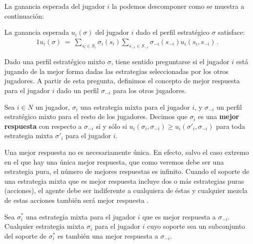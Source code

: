 La ganancia esperada del jugador $i$ la podemos descomponer como se muestra a continuación:

\begin{theorem}
\label{theo:ganancia-esperada}
La ganancia esperada $u_i(\sigma)$ del jugador $i$ dado el perfil estratégico $\sigma$ satisface:
\begin{alignat}{1}
u_i(\sigma)\ =\ \sum_{s_i\in S_i} \sigma_i(s_i) \sum_{s_{-i}\in S_{-i}} \sigma_{-i}(s_{-i}) u_i(s_i,s_{-i}) \,.
\end{alignat}
\end{theorem}

Dado una perfil estratégico mixto $\sigma$, tiene sentido preguntarse si el jugador $i$ está jugando de la mejor forma dadas las estrategias seleccionadas por los otros jugadores. A partir de esta pregunta, definimos el concepto de mejor respuesta para el jugador $i$ dado un perfil $\sigma_{-i}$ para los otros jugadores.

\begin{definition}
\label{def:mejor-respuesta}
Sea $i\in N$ un jugador, $\sigma_i$ una estrategia mixta para el jugador $i$, y $\sigma_{-i}$ un perfil estratégico mixto para el resto de los jugadores. Decimos que $\sigma_i$ es una \textbf{mejor respuesta} con respecto a $\sigma_{-i}$ si y s\'olo si
$u_i(\sigma_i,\sigma_{-i}) \geq u_i(\sigma'_i,\sigma_{-i})$ para toda estrategia mixta $\sigma'_i$ para el jugador $i$.
\end{definition}

Una mejor respuesta no es necesariamente única. En efecto, salvo el caso extremo en el que hay una única mejor respuesta, que como veremos debe ser una estrategia pura, el número de mejores respuestas es infinito. Cuando el soporte de una estrategia mixta que es mejor respuesta incluye dos o más estrategias puras (acciones), el agente debe ser indiferente a cualquiera de éstas y cualquier mezcla de estas  acciones también será mejor respuesta \cite{bib:tutorial-existence-nash}.

\begin{theorem}
\label{theo:mejor-respuesta}
Sea $\sigma^*_i$ una estrategia mixta para el jugador $i$ que es mejor respuesta a $\sigma_{-i}$. Cualquier estrategia mixta $\sigma_i$ para el jugador $i$ cuyo soporte sea un subconjunto del soporte de $\sigma^*_i$ es también una mejor respuesta a $\sigma_{-i}$.
\end{theorem}

